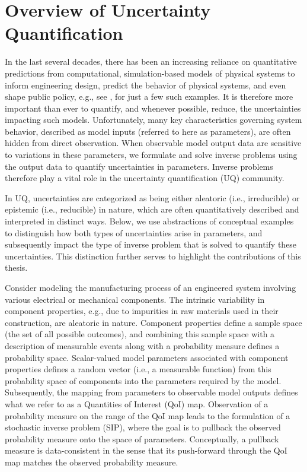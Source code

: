 \section{Overview of Uncertainty Quantification}\label{sec:intro}

In the last several decades, there has been an increasing reliance on quantitative predictions from computational, simulation-based models of physical systems to inform engineering design, predict the behavior of physical systems, and even shape public policy, e.g., see \cite{VO14, VO15, BDMV, HV}, for just a few such examples.
It is therefore more important than ever to quantify, and whenever possible, reduce, the uncertainties impacting such models.
Unfortunately, many key characteristics governing system behavior, described as model inputs (referred to here as parameters), are often hidden from direct observation.
When observable model output data are sensitive to variations in these parameters, we formulate and solve inverse problems using the output data to quantify uncertainties in parameters.
Inverse problems therefore play a vital role in the uncertainty quantification (UQ) community.

In UQ, uncertainties are categorized as being either aleatoric (i.e., irreducible) or epistemic (i.e., reducible) in nature, which are often quantitatively described and interpreted in distinct ways.
Below, we use abstractions of conceptual examples to distinguish how both types of uncertainties arise in parameters, and subsequently impact the type of inverse problem that is solved to quantify these uncertainties.
This distinction further serves to highlight the contributions of this thesis.

Consider modeling the manufacturing process of an engineered system involving various electrical or mechanical components.
The intrinsic variability in component properties, e.g., due to impurities in raw materials used in their construction, are aleatoric in nature.
Component properties define a sample space (the set of all possible outcomes), and combining this sample space with a description of measurable events along with a probability measure defines a probability space.
Scalar-valued model parameters associated with component properties defines a random vector (i.e., a measurable function) from this probability space of components into the parameters required by the model.
Subsequently, the mapping from parameters to observable model outputs defines what we refer to as a Quantities of Interest (QoI) map.
Observation of a probability measure on the range of the QoI map leads to the formulation of a stochastic inverse problem (SIP), where the goal is to pullback the observed probability measure onto the space of parameters.
Conceptually, a pullback measure is data-consistent in the sense that its push-forward through the QoI map matches the observed probability measure.


